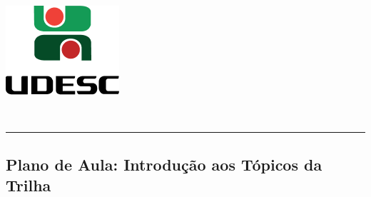 \thispagestyle{empty}
\begin{center}
	\begin{minipage}[!]{\linewidth}
		\begin{minipage}[!]{.19\linewidth}
			\includegraphics[width=\linewidth]{assets/logo.png}
		\end{minipage}
		\begin{minipage}[!]{.8\linewidth}
			\center
			\ABNTEXchapterfont\normalsize\MakeUppercase{\imprimirinstituicao}
			\par
			\vspace*{10pt}                     
			\ABNTEXchapterfont\normalsize\MakeUppercase{\centro}
			\par
			\vspace*{10pt}           
			\ABNTEXchapterfont\normalsize\MakeUppercase{\disciplina}
		\end{minipage}        
	\end{minipage}
	\\ \vspace{0.5cm}
	\rule{\textwidth}{.5pt}   
\end{center}
\textual
\begin{center}
	\section{Plano de Aula: Introdução aos Tópicos da Trilha} %
	\label{sec:Plano de Aula: Introdução aos Tópicos da Trilha}
\end{center}
